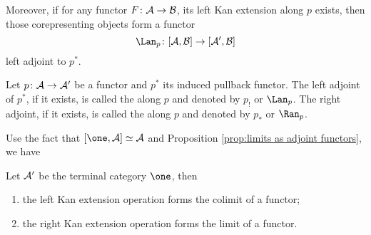   Moreover, if for any functor $F\colon{\cal A}\to{\cal B}$, its left Kan extension along $p$ exists, then those corepresenting objects form a functor
  \begin{equation*}
    \Lan_p\colon[\Aa,\Bb]\to[\Aa',\Bb]
  \end{equation*}
  left adjoint to $p^{\ast}$.
  \begin{defn}
    Let $p\colon{\cal A}\to{\cal A}'$ be a functor and $p^{\ast}$ its induced pullback functor. The left adjoint of $p^{\ast}$, if it exists, is called the  along $p$ and denoted by $p_{!}$ or $\Lan_p$. The right adjoint, if it exists, is called the  along $p$ and denoted by $p_{\ast}$ or $\Ran_p$.
  \end{defn}

  Use the fact that $[\one,\Aa]\simeq\Aa$ and Proposition \ref{prop:limits as adjoint functors}, we have
  \begin{prop}
    Let ${\cal A}'$ be the terminal category $\one$, then
    \begin{enumerate}
      \item the left Kan extension operation forms the colimit of a functor;
      \item the right Kan extension operation forms the limit of a functor.
    \end{enumerate}
  \end{prop}

